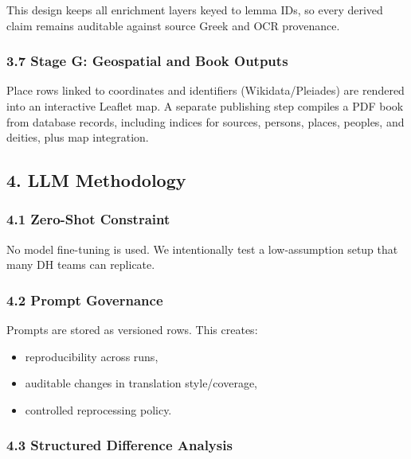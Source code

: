 \documentclass[
]{article}
\providecommand{\tightlist}{%
  \setlength{\itemsep}{0pt}\setlength{\parskip}{0pt}}
\begin{document}
This design keeps all enrichment layers keyed to lemma IDs, so every
derived claim remains auditable against source Greek and OCR provenance.

\hypertarget{37-stage-g-geospatial-and-book-outputs}{%
\subsubsection{3.7 Stage G: Geospatial and Book
Outputs}\label{37-stage-g-geospatial-and-book-outputs}}

Place rows linked to coordinates and identifiers (Wikidata/Pleiades) are
rendered into an interactive Leaflet map. A separate publishing step
compiles a PDF book from database records, including indices for
sources, persons, places, peoples, and deities, plus map integration.

\hypertarget{4-llm-methodology}{%
\subsection{4. LLM Methodology}\label{4-llm-methodology}}

\hypertarget{41-zero-shot-constraint}{%
\subsubsection{4.1 Zero-Shot Constraint}\label{41-zero-shot-constraint}}

No model fine-tuning is used. We intentionally test a low-assumption
setup that many DH teams can replicate.

\hypertarget{42-prompt-governance}{%
\subsubsection{4.2 Prompt Governance}\label{42-prompt-governance}}

Prompts are stored as versioned rows. This creates:

\begin{itemize}
\tightlist
\item
  reproducibility across runs,
\item
  auditable changes in translation style/coverage,
\item
  controlled reprocessing policy.
\end{itemize}

\hypertarget{43-structured-difference-analysis}{%
\subsubsection{4.3 Structured Difference
Analysis}\label{43-structured-difference-analysis}}
\end{document}
